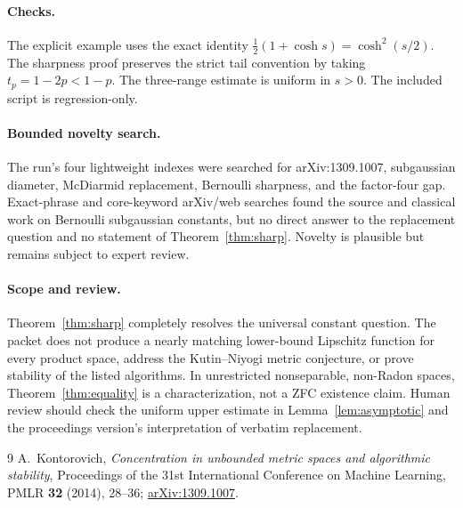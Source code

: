 \documentclass[11pt]{article}
\begin{document}
\paragraph{Checks.}
The explicit example uses the exact identity
$\frac12(1+\cosh s)=\cosh^2(s/2)$. The sharpness proof preserves the strict
tail convention by taking $t_p=1-2p<1-p$. The three-range estimate is uniform
in $s>0$. The included script is regression-only.

\paragraph{Bounded novelty search.}
The run's four lightweight indexes were searched for arXiv:1309.1007,
subgaussian diameter, McDiarmid replacement, Bernoulli sharpness, and the
factor-four gap. Exact-phrase and core-keyword arXiv/web searches found the
source and classical work on Bernoulli subgaussian constants, but no direct
answer to the replacement question and no statement of
Theorem~\ref{thm:sharp}. Novelty is plausible but remains subject to expert
review.

\paragraph{Scope and review.}
Theorem~\ref{thm:sharp} completely resolves the universal constant question.
The packet does not produce a nearly matching lower-bound Lipschitz function
for every product space, address the Kutin--Niyogi metric conjecture, or prove
stability of the listed algorithms. In unrestricted nonseparable, non-Radon
spaces, Theorem~\ref{thm:equality} is a characterization, not a ZFC existence
claim. Human review should check the uniform upper estimate in
Lemma~\ref{lem:asymptotic} and the proceedings version's interpretation of
verbatim replacement.

\begin{thebibliography}{9}
A.~Kontorovich,
\emph{Concentration in unbounded metric spaces and algorithmic stability},
Proceedings of the 31st International Conference on Machine Learning,
PMLR \textbf{32} (2014), 28--36;
\href{https://arxiv.org/abs/1309.1007}{arXiv:1309.1007}.
\end{thebibliography}
\end{document}
